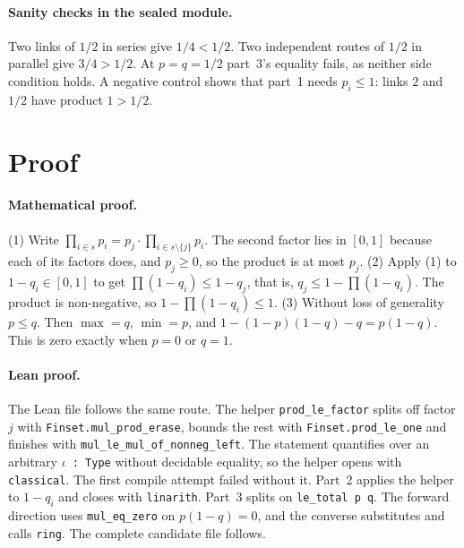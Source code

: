 \documentclass[11pt]{article}
\begin{document}
\paragraph{Sanity checks in the sealed module.} Two links of $1/2$ in series give $1/4<1/2$. Two
independent routes of $1/2$ in parallel give $3/4>1/2$. At $p=q=1/2$ part~3's equality fails, as neither
side condition holds. A negative control shows that part~1 needs $p_i\le 1$: links $2$ and $1/2$ have
product $1>1/2$.

\section{Proof}
\paragraph{Mathematical proof.} (1) Write $\prod_{i\in s}p_i=p_j\cdot\prod_{i\in s\setminus\{j\}}p_i$.
The second factor lies in $[0,1]$ because each of its factors does, and $p_j\ge0$, so the product is at
most $p_j$. (2) Apply (1) to $1-q_i\in[0,1]$ to get $\prod(1-q_i)\le 1-q_j$, that is,
$q_j\le 1-\prod(1-q_i)$. The product is non-negative, so $1-\prod(1-q_i)\le1$. (3) Without loss of
generality $p\le q$. Then $\max=q$, $\min=p$, and $1-(1-p)(1-q)-q=p(1-q)$. This is zero exactly when
$p=0$ or $q=1$.

\paragraph{Lean proof.} The Lean file follows the same route. The helper \texttt{prod\_le\_factor}
splits off factor $j$ with \texttt{Finset.mul\_prod\_erase}, bounds the rest with
\texttt{Finset.prod\_le\_one} and finishes with \texttt{mul\_le\_mul\_of\_nonneg\_left}. The statement
quantifies over an arbitrary $\iota$\texttt{ : Type} without decidable equality, so the helper opens with
\texttt{classical}. The first compile attempt failed without it. Part~2 applies the helper to
$1-q_i$ and closes with \texttt{linarith}. Part~3 splits on \texttt{le\_total p q}. The forward
direction uses \texttt{mul\_eq\_zero} on $p(1-q)=0$, and the converse substitutes and calls
\texttt{ring}. The complete candidate file follows.
\end{document}
